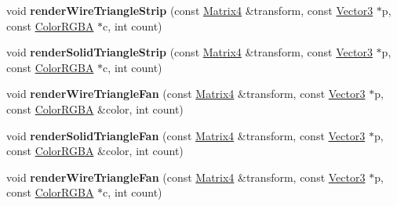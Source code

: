 \begin{DoxyCompactItemize}
\item 
void {\bfseries render\+Wire\+Triangle\+Strip} (const \hyperlink{class_magnum_1_1_matrix4}{Matrix4} \&transform, const \hyperlink{class_magnum_1_1_vector3}{Vector3} $\ast$p, const \hyperlink{class_magnum_1_1_color_r_g_b_a}{Color\+R\+G\+BA} $\ast$c, int count)\hypertarget{class_magnum_1_1_i_component_debug_renderer_ada247203df7f38c148f1e106feb8c8bd}{}\label{class_magnum_1_1_i_component_debug_renderer_ada247203df7f38c148f1e106feb8c8bd}

\item 
void {\bfseries render\+Solid\+Triangle\+Strip} (const \hyperlink{class_magnum_1_1_matrix4}{Matrix4} \&transform, const \hyperlink{class_magnum_1_1_vector3}{Vector3} $\ast$p, const \hyperlink{class_magnum_1_1_color_r_g_b_a}{Color\+R\+G\+BA} $\ast$c, int count)\hypertarget{class_magnum_1_1_i_component_debug_renderer_aee2b2d572d55e0da9dce15a44d38482c}{}\label{class_magnum_1_1_i_component_debug_renderer_aee2b2d572d55e0da9dce15a44d38482c}

\item 
void {\bfseries render\+Wire\+Triangle\+Fan} (const \hyperlink{class_magnum_1_1_matrix4}{Matrix4} \&transform, const \hyperlink{class_magnum_1_1_vector3}{Vector3} $\ast$p, const \hyperlink{class_magnum_1_1_color_r_g_b_a}{Color\+R\+G\+BA} \&color, int count)\hypertarget{class_magnum_1_1_i_component_debug_renderer_ab0effa0625b471841df6ab8657a23b13}{}\label{class_magnum_1_1_i_component_debug_renderer_ab0effa0625b471841df6ab8657a23b13}

\item 
void {\bfseries render\+Solid\+Triangle\+Fan} (const \hyperlink{class_magnum_1_1_matrix4}{Matrix4} \&transform, const \hyperlink{class_magnum_1_1_vector3}{Vector3} $\ast$p, const \hyperlink{class_magnum_1_1_color_r_g_b_a}{Color\+R\+G\+BA} \&color, int count)\hypertarget{class_magnum_1_1_i_component_debug_renderer_aa75042a3f7713641d32d8fe9bf8bef67}{}\label{class_magnum_1_1_i_component_debug_renderer_aa75042a3f7713641d32d8fe9bf8bef67}

\item 
void {\bfseries render\+Wire\+Triangle\+Fan} (const \hyperlink{class_magnum_1_1_matrix4}{Matrix4} \&transform, const \hyperlink{class_magnum_1_1_vector3}{Vector3} $\ast$p, const \hyperlink{class_magnum_1_1_color_r_g_b_a}{Color\+R\+G\+BA} $\ast$c, int count)\hypertarget{class_magnum_1_1_i_component_debug_renderer_abcf64331eca38d235196c7b89dca0844}{}\label{class_magnum_1_1_i_component_debug_renderer_abcf64331eca38d235196c7b89dca0844}


\end{DoxyCompactItemize}
